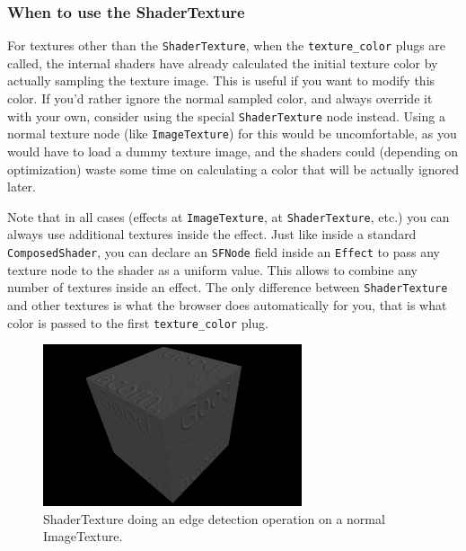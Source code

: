 \documentclass{egpubl}
\begin{document}
\subsubsection{When to use the ShaderTexture}

For textures other than the \texttt{ShaderTexture},
when the \texttt{texture\_color} plugs are called,
the internal shaders have already calculated the initial texture
color by actually sampling the texture image. This is useful if you
want to modify this color. If you'd rather ignore the normal
sampled color, and always override it with your own, consider using
the special \texttt{ShaderTexture} node instead. Using
a normal texture node (like \texttt{ImageTexture}) for this
would be uncomfortable, as you would have to load a dummy texture image,
and the shaders could (depending on optimization) waste some time
on calculating a color that will be actually ignored later.

Note that in all cases (effects at \texttt{ImageTexture},
at \texttt{ShaderTexture}, etc.) you can always use additional
textures inside the effect. Just like inside a standard \texttt{ComposedShader},
you can declare an \texttt{SFNode} field inside an \texttt{Effect}
to pass any texture node to the shader as a uniform value.
This allows to combine any number of textures inside an effect.
The only difference
between \texttt{ShaderTexture} and other textures is what the browser
does automatically for you, that is what color is passed
to the first \texttt{texture\_color} plug.

\begin{figure}[H]
  \centering
  \includegraphics[width=3in]{shader_texture_edge_detection}
  \caption{ShaderTexture doing an edge detection operation on a normal ImageTexture.}
\end{figure}

\end{document}
